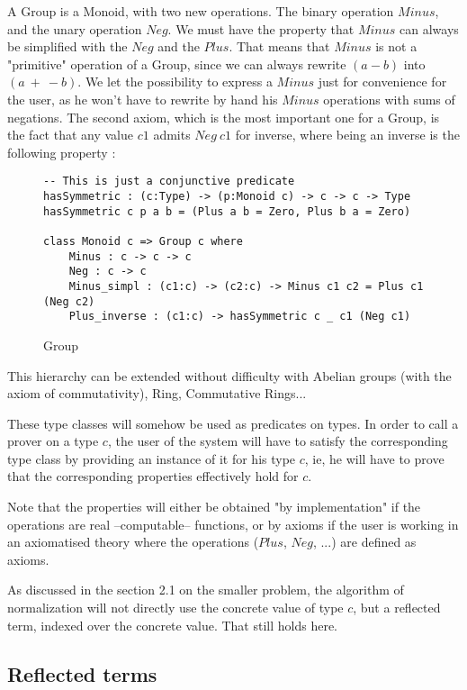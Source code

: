 A Group is a Monoid, with two new operations. The binary operation $Minus$, and the unary operation $Neg$. We must have the property that $Minus$ can always be simplified with the $Neg$ and the $Plus$. That means that $Minus$ is not a "primitive" operation of a Group, since we can always rewrite $(a-b)$ into $(a\ +\ -b)$. We let the possibility to express a $Minus$ just for convenience for the user, as he won't have to rewrite by hand his $Minus$ operations with sums of negations.
The second axiom, which is the most important one for a Group, is the fact that any value $c1$ admits $Neg\ c1$ for inverse, where being an inverse is the following property :

\begin{figure}[H]
\figrule
\begin{center}
\begin{verbatim}
-- This is just a conjunctive predicate
hasSymmetric : (c:Type) -> (p:Monoid c) -> c -> c -> Type
hasSymmetric c p a b = (Plus a b = Zero, Plus b a = Zero)    
  
class Monoid c => Group c where
    Minus : c -> c -> c
    Neg : c -> c
    Minus_simpl : (c1:c) -> (c2:c) -> Minus c1 c2 = Plus c1 (Neg c2) 
    Plus_inverse : (c1:c) -> hasSymmetric c _ c1 (Neg c1)
\end{verbatim}
\end{center}
\caption{Group}
\figrule
\end{figure}


This hierarchy can be extended without difficulty with Abelian groups (with the axiom of commutativity), Ring, Commutative Rings...

These type classes will somehow be used as predicates on types. In order to call a prover on a type $c$, the user of the system will have to satisfy the corresponding type class by providing an instance of it for his type $c$, ie, he will have to prove that the corresponding properties effectively hold for $c$.

Note that the properties will either be obtained "by implementation" if the operations are real --computable-- functions, or by axioms if the user is working in an axiomatised theory where the operations ($Plus$, $Neg$, ...) are defined as axioms.

As discussed in the section 2.1 on the smaller problem, the algorithm of normalization will not directly use the concrete value of type $c$, but a reflected term, indexed over the concrete value. That still holds here.


	\subsection {Reflected terms}

